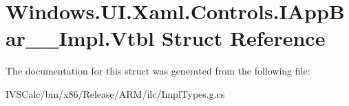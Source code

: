 \hypertarget{struct_windows_1_1_u_i_1_1_xaml_1_1_controls_1_1_i_app_bar_____impl_1_1_vtbl}{}\section{Windows.\+U\+I.\+Xaml.\+Controls.\+I\+App\+Bar\+\_\+\+\_\+\+Impl.\+Vtbl Struct Reference}
\label{struct_windows_1_1_u_i_1_1_xaml_1_1_controls_1_1_i_app_bar_____impl_1_1_vtbl}


The documentation for this struct was generated from the following file\+:\begin{DoxyCompactItemize}
\item 
I\+V\+S\+Calc/bin/x86/\+Release/\+A\+R\+M/ilc/Impl\+Types.\+g.\+cs\end{DoxyCompactItemize}
